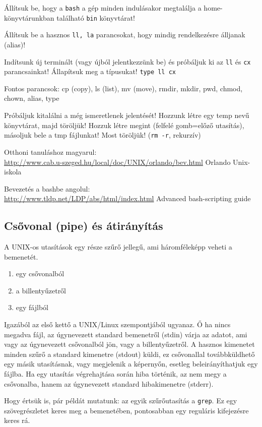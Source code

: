 \documentclass[a4paper]{article}
\newcommand{\code}{\texttt}
\newcommand{\dir}{\code}
\begin{document}
Állítsuk be, hogy a \code{bash} a gép minden indulásakor megtalálja a
home-könyvtárunkban található \dir{bin} könyvtárat!

Állítsuk be a hasznos \code{ll, la} parancsokat, hogy mindig
rendelkezésre álljanak (alias)!

Indítsunk új terminált (vagy újból jelentkezzünk be) és próbáljuk ki az
\code{ll} és \code{cx} parancsainkat! Állapítsuk meg a típusukat!
\code{type ll cx}

Fontos parancsok: cp (copy), ls (list), mv (move), rmdir, mkdir, pwd,
chmod, chown, alias, type

Próbáljuk kitalálni a még ismeretlenek jelentését! Hozzunk létre egy
temp nevű könyvtárat, majd töröljük! Hozzuk létre megint (felfelé
gomb=előző utasítás), másoljuk bele a tmp fájlunkat! Most töröljük!
(\code{rm -r}, rekurzív)

Otthoni tanuláshoz magyarul:\\
\url{http://www.cab.u-szeged.hu/local/doc/UNIX/orlando/bev.html} Orlando
Unix-iskola

Bevezetés a bashbe angolul:\\
\url{http://www.tldp.net/LDP/abs/html/index.html} Advanced bash-scripting guide

\subsection{Csővonal (pipe) és átirányítás}
\label{sub:pipe}

A UNIX-os utasítások egy része szűrő jellegű, ami háromféleképp veheti a
bemenetét.
\begin{enumerate}
\item egy csővonalból
\item a billentyűzetről
\item egy fájlból
\end{enumerate}

Igazából az első kettő a UNIX/Linux szempontjából ugyanaz. Ő ha nincs
megadva fájl, az úgynevezett standard bemenetről (stdin) várja az adatot, ami
vagy az úgynevezett csővonalból jön, vagy a billentyűzetről. A hasznos
kimenetet minden szűrő a standard kimenetre (stdout) küldi, ez
csővonallal továbbküldhető egy másik utasításnak, vagy megjelenik a
képernyőn, esetleg beleirányíthatjuk egy fájlba. Ha egy utasítás
végrehajtása során hiba történik, az nem megy a csővonalba, hanem az
úgynevezett standard hibakimenetre (stderr).

Hogy értsük is, pár példát mutatunk: az egyik szűrőutasítás a
\code{grep}. Ez egy szövegrészletet keres meg a bemenetében, pontosabban
egy reguláris kifejezésre keres rá.
\end{document}
